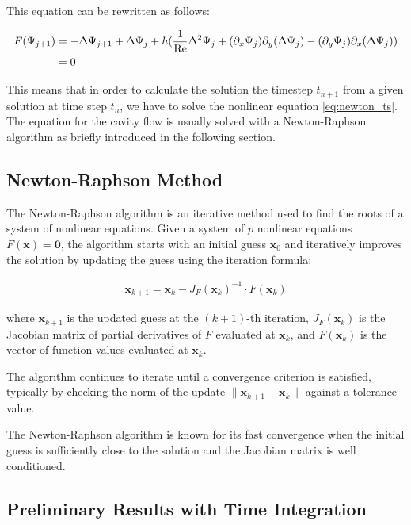 This equation can be rewritten as follows:

\begin{align}
  F(\Psi_{j+1}) & = - \Delta\Psi_{j+1} + \Delta\Psi_j + h (\frac{1}{\mathrm{Re}}\Delta^2 \Psi_j +
    (\partial_x \Psi_j) \partial_y(\Delta \Psi_j) -
    (\partial_y \Psi_j) \partial_x(\Delta \Psi_j)) \nonumber \\
  & =  0 \label{eq:newton_ts}
\end{align}

This means that in order to calculate the solution the timestep $t_{n+1}$ from
a given solution at time step $t_n$, we have to solve the nonlinear equation
\eqref{eq:newton_ts}. The equation for the cavity flow is usually solved with a
Newton-Raphson algorithm \citep{kuhlmann2019} as briefly introduced in the
following section. 

\subsection{Newton-Raphson Method}

The Newton-Raphson algorithm is an iterative method used to find the roots of a
system of nonlinear equations. Given a system of $p$ nonlinear equations
$F(\mathbf{x}) = \mathbf{0}$, the algorithm starts with an initial guess
$\mathbf{x}_0$ and iteratively improves the solution by updating the guess
using the iteration formula:

\begin{align} \mathbf{x}_{k+1} = \mathbf{x}_k - J_F(\mathbf{x}_k)^{-1} \cdot
F(\mathbf{x}_k) \end{align}

where $\mathbf{x}_{k+1}$ is the updated guess at the $(k+1)$-th iteration,
$J_F(\mathbf{x}_k)$ is the Jacobian matrix of partial derivatives of $F$
evaluated at $\mathbf{x}_k$, and $F(\mathbf{x}_k)$ is the vector of function
values evaluated at $\mathbf{x}_k$.

The algorithm continues to iterate until a convergence criterion is satisfied,
typically by checking the norm of the update $\|\mathbf{x}_{k+1} -
\mathbf{x}_k\|$ against a tolerance value.

The Newton-Raphson algorithm is known for its fast convergence when the initial
guess is sufficiently close to the solution and the Jacobian matrix is well
conditioned.

\subsection{Preliminary Results with Time Integration}


